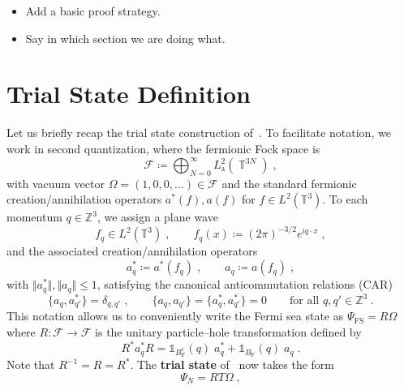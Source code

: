 \documentclass[12pt,a4paper]{article}
\numberwithin{equation}{section}
\newcommand{\cF}{\mathcal{F}}
\newcommand{\TTT}{\mathbb{T}}
\newcommand{\ZZZ}{\mathbb{Z}}
\newcommand{\1}{\mathbb{I}}
\newcommand{\F}{\mathrm{F}}
\newcommand{\FS}{\mathrm{FS}}
\DeclareMathOperator{\T}{\mathbb{T}}
\theoremstyle{plain}
\theoremstyle{definition}
\theoremstyle{remark}
\theoremstyle{plain}
\theoremstyle{definition}
\theoremstyle{remark}
\begin{document}
\begin{itemize}
\item Add a basic proof strategy.

\item Say in which section we are doing what.
\end{itemize}





\section{Trial State Definition}
\label{sec:trialstate}

Let us briefly recap the trial state construction of~\cite{CHN23}. To facilitate notation, we work in second quantization, where the fermionic Fock space is
\begin{equation}
	\cF \coloneq \bigoplus_{N=0}^\infty L^2_{\mathrm{a}}(\T^{3N}) \;,
\end{equation}
with vacuum vector $ \Omega = (1,0,0,\ldots) \in \cF $ and the standard fermionic creation/annihilation operators $ a^*(f), a(f) $ for $ f \in L^2(\TTT^3) $. To each momentum $ q \in \ZZZ^3 $, we assign a plane wave
\begin{equation}
	f_q \in L^2(\TTT^3) \;, \qquad
	f_q(x) \coloneq (2 \pi)^{-3/2} e^{i q \cdot x} \;,
\end{equation}
and the associated creation/annihilation operators
\begin{equation}
	a^*_q \coloneq a^*(f_q) \;, \qquad
	a_q \coloneq a(f_q) \;,
\end{equation}
with $ \Vert a_q^* \Vert, \Vert a_q \Vert \le 1 $, satisfying the canonical anticommutation relations (CAR)
\begin{equation} \label{eq:CAR}
	\{a_q, a_{q'}^*\} = \delta_{q, q'} \;, \qquad
	\{a_q, a_{q'}\} = \{a_q^*, a_{q'}^*\} = 0 \qquad \text{for all } q, q' \in \ZZZ^3\;.
\end{equation}
This notation allows us to conveniently write the Fermi sea state as $ \Psi_{\FS} = R \Omega $ where $ R: \cF \to \cF $ is the unitary particle--hole transformation defined by
\begin{equation} \label{eq:R}
	R^* a_q^* R
	= \mathds{1}_{B_{\F}^c}(q) \; a_q^*
		+ \mathds{1}_{B_{\F}}(q) \; a_q \;.
\end{equation}
Note that $ R^{-1} = R = R^* $. The \textbf{trial state} of~\cite{CHN23} now takes the form
\begin{equation} \label{eq:Psitrial}
	\Psi_N = R T \Omega \;,
\end{equation}
\end{document}

